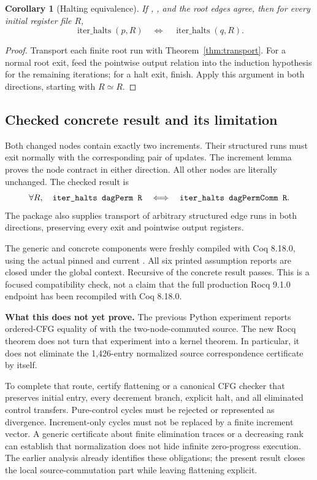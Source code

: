 \documentclass[11pt,letterpaper]{article}
\newtheorem{corollary}[theorem]{Corollary}
\theoremstyle{definition}
\newcommand{\code}[1]{\texttt{\detokenize{#1}}}
\newcommand{\RegEq}{\mathrel{\simeq}}
\begin{document}
\begin{corollary}[Halting equivalence]
If \code{ClosedExt p q}, \code{ClosedExt q p}, and the root edges agree, then
for every initial register file $R$,
\[
 \operatorname{iter\_halts}(p,R)
 \quad\Longleftrightarrow\quad
 \operatorname{iter\_halts}(q,R).
\]
\end{corollary}

\begin{proof}
Transport each finite root run with Theorem~\ref{thm:transport}. For a normal
root exit, feed the pointwise output relation into the induction hypothesis
for the remaining iterations; for a halt exit, finish. Apply this argument in
both directions, starting with $R\RegEq R$.
\end{proof}

\subsection{Checked concrete result and its limitation}

Both changed nodes contain exactly two increments. Their structured runs must
exit normally with the corresponding pair of updates. The increment lemma
proves the node contract in either direction. All other nodes are literally
unchanged. The checked result is
\[
 \forall R,\quad
 \code{iter_halts dagPerm R}
 \quad\Longleftrightarrow\quad
 \code{iter_halts dagPermComm R}.
\]
The package also supplies transport of arbitrary structured edge runs in both
directions, preserving every exit and pointwise output registers.

The generic and concrete components were freshly compiled with Coq 8.18.0,
using the actual pinned \code{RM.v} and current \code{DagPerm.v}. All six
printed assumption reports are closed under the global context. Recursive
\code{coqchk} of the concrete result passes. This is a focused compatibility
check, not a claim that the full production Rocq 9.1.0 endpoint has been
recompiled with Coq 8.18.0.

\textbf{What this does not yet prove.} The previous Python experiment reports
ordered-CFG equality of \code{p215} with the two-node-commuted source. The new
Rocq theorem does not turn that experiment into a kernel theorem. In
particular, it does not eliminate the 1,426-entry normalized source
correspondence certificate by itself.

To complete that route, certify flattening or a canonical CFG checker that
preserves initial entry, every decrement branch, explicit halt, and all
eliminated control transfers. Pure-control cycles must be rejected or
represented as divergence. Increment-only cycles must not be replaced by a
finite increment vector. A generic certificate about finite elimination
traces or a decreasing rank can establish that normalization does not hide
infinite zero-progress execution. The earlier analysis already identifies
these obligations; the present result closes the local source-commutation
part while leaving flattening explicit.
\end{document}
